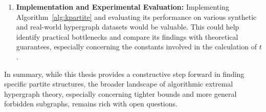 \begin{enumerate}
    \item \textbf{Implementation and Experimental Evaluation:}
    Implementing Algorithm~\ref{alg:kpartite}
    and evaluating its performance on various synthetic and real-world hypergraph datasets would be valuable.
    This could help identify practical bottlenecks and compare its findings with theoretical guarantees,
    especially concerning the constants involved in the calculation of $t$.
\end{enumerate}

In summary, while this thesis provides a constructive step forward in finding specific partite structures,
the broader landscape of algorithmic extremal hypergraph theory, especially concerning tighter bounds and more general forbidden subgraphs,
remains rich with open questions.
